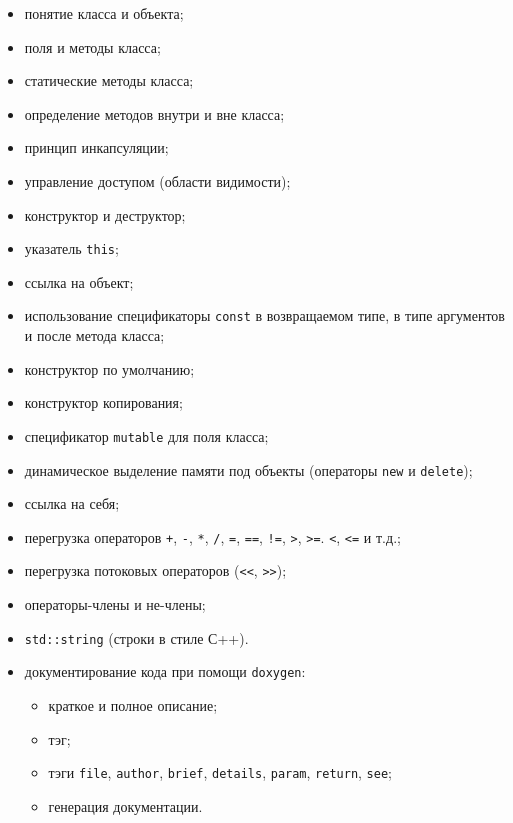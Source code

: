 \documentclass[a4paper,12pt]{article}
\begin{document}


\begin{itemize}
\item понятие класса и объекта;
\item поля и методы класса;
\item статические методы класса;
\item определение методов внутри и вне класса;
\item принцип инкапсуляции;
\item управление доступом (области видимости);
\item конструктор и деструктор;
\item указатель \lstinline|this|;
\item ссылка на объект;
\item использование спецификаторы \lstinline|const| в возвращаемом
  типе, в типе аргументов и после метода класса;
\item конструктор по умолчанию;
\item конструктор копирования;
\item спецификатор \lstinline|mutable| для поля класса;
\item динамическое выделение памяти под объекты (операторы
  \lstinline|new| и \lstinline|delete|);
\item ссылка на себя;
\item перегрузка операторов \lstinline|+|, \lstinline|-|,
  \lstinline|*|, \lstinline|/|, \lstinline|=|, \lstinline|==|,
  \lstinline|!=|, \lstinline|>|, \lstinline|>=|. \lstinline|<|,
  \lstinline|<=| и т.д.;
\item перегрузка потоковых операторов (\lstinline|<<|,
  \lstinline|>>|);
\item операторы-члены и не-члены;
\item \lstinline|std::string| (строки в стиле С++).
\item документирование кода при помощи \verb|doxygen|:
  \begin{itemize}
  \item краткое и полное описание;
  \item тэг;
  \item тэги \verb|file|, \verb|author|, \verb|brief|, \verb|details|,
    \verb|param|, \verb|return|, \verb|see|;
  \item генерация документации.
  \end{itemize}
\end{itemize}
\end{document}
